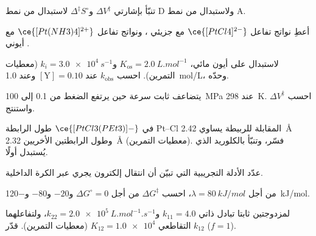 \begin{exercise}[$\star$]\label{exo:b3:complex-mechanisms:3}
تنبّأ بإشارتي $\Delta V^{\ddagger}$ و$\Delta^{\ddagger}S^\circ$ لاستبدال من نمط D ولاستبدال من نمط A.
\end{exercise}

\begin{exercise}[$\star$]\label{exo:b3:complex-mechanisms:4}
أعطِ نواتج تفاعل $\ce{[PtCl4]^{2-}}$ مع جزيئي ، ونواتج تفاعل $\ce{[Pt(NH3)4]^{2+}}$ مع أيوني .
\end{exercise}

\begin{exercise}[$\star\star$]\label{exo:b3:complex-mechanisms:5}
لاستبدال على أيون مائي، $K_{\mathrm{os}} = \qty{2.0}{L.mol^{-1}}$ و$k_i = \qty{3.0e4}{s^{-1}}$ (معطيات
التمرين). احسب $k_{\mathrm{obs}}$ عند $[\mathrm Y] = 0.10$ وعند \qty{1.0}{mol/L}، وحدّه.
\end{exercise}

\begin{exercise}[$\star\star$]\label{exo:b3:complex-mechanisms:6}
يتضاعف ثابت سرعة حين يرتفع الضغط من 0.1 إلى \qty{100}{MPa} عند \qty{298}{K}.
احسب $\Delta V^{\ddagger}$ واستنتج.
\end{exercise}

\begin{exercise}[$\star\star$]\label{exo:b3:complex-mechanisms:7}
في $\ce{[PtCl3(PEt3)]-}$ طول الرابطة Pt--Cl المقابلة للربيطة  يساوي \qty{2.42}{\angstrom} وطول الرابطتين الأخريين \qty{2.32}{\angstrom}
(معطيات التمرين). فسّر، وتنبّأ بالكلوريد الذي يُستبدل أولًا.
\end{exercise}

\begin{exercise}[$\star\star$]\label{exo:b3:complex-mechanisms:8}
عدّد الأدلة التجريبية التي تبيّن أن انتقال إلكترون يجري عبر الكرة
الداخلية.
\end{exercise}

\begin{exercise}[$\star\star$]\label{exo:b3:complex-mechanisms:9}
من أجل $\lambda = \qty{80}{kJ/mol}$، احسب $\Delta G^{\ddagger}$ من أجل $\Delta G^\circ = 0$ و$-20$ و$-80$ و\qty{-120}{kJ/mol}.
\end{exercise}

\begin{exercise}[$\star\star\star$]\label{exo:b3:complex-mechanisms:10}
لمزدوجتين ثابتا تبادل ذاتي $k_{11} = 4.0$ و$k_{22} = \qty{2.0e5}{L.mol^{-1}.s^{-1}}$، 
ولتفاعلهما التقاطعي $K_{12} = \num{1.0e4}$ (معطيات التمرين). قدّر $k_{12}$ ($f = 1$).
\end{exercise}

